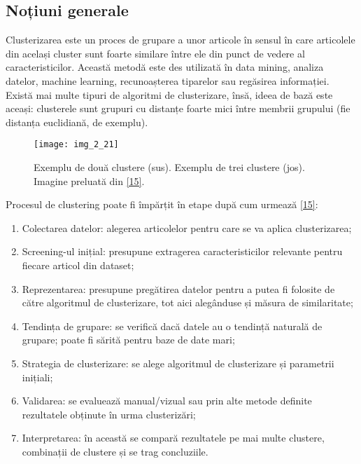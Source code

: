 \subsection{Noțiuni generale}

Clusterizarea este un proces de grupare a unor articole în sensul în care articolele din același cluster sunt foarte similare între ele din punct de vedere al caracteristicilor. Această metodă este des utilizată în data mining, analiza datelor, machine learning, recunoașterea tiparelor sau regăsirea informației. Există mai multe tipuri de algoritmi de clusterizare, însă, ideea de bază este aceași: clusterele sunt grupuri cu distanțe foarte mici între membrii grupului (fie distanța euclidiană, de exemplu).

\begin{figure}[!h]
	\centering
	\texttt{[image: img\_2\_21]}
	\caption[Exemplu clustere]{Exemplu de două clustere (sus). Exemplu de trei clustere (jos). Imagine preluată din \hyperlink{dataclusteringtechniques}{[15]}.}
\end{figure}  

Procesul de clustering poate fi împărțit în etape după cum urmează \hyperlink{dataclusteringtechniques}{[15]}:
\begin{enumerate}
	\item Colectarea datelor: alegerea articolelor pentru care se va aplica clusterizarea;
	\item Screening-ul inițial: presupune extragerea caracteristicilor relevante pentru fiecare articol din dataset;
	\item Reprezentarea: presupune pregătirea datelor pentru a putea fi folosite de către algoritmul de clusterizare, tot aici alegânduse și măsura de similaritate;
	\item Tendința de grupare: se verifică dacă datele au o tendință naturală de grupare; poate fi sărită pentru baze de date mari;
	\item Strategia de clusterizare: se alege algoritmul de clusterizare și parametrii inițiali;
	\item Validarea: se evaluează manual/vizual sau prin alte metode definite rezultatele obținute în urma clusterizări;
	\item Interpretarea: în această se compară rezultatele pe mai multe clustere, combinații de clustere și se trag concluziile.
\end{enumerate}

